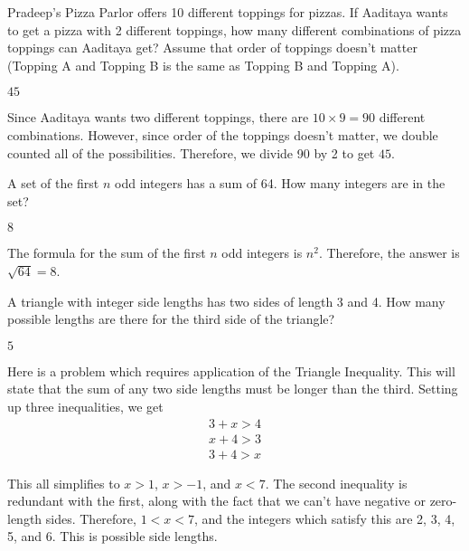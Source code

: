 \documentclass[11pt]{article}
\begin{document}
\begin{problem}
Pradeep's Pizza Parlor offers 10 different toppings for pizzas. If Aaditaya wants to get a pizza with 2 different toppings, how many different combinations of pizza toppings can Aaditaya get? Assume that order of toppings doesn't matter (Topping A and Topping B is the same as Topping B and Topping A).
\end{problem}
\begin{answer}
$\boxed{45}$
\end{answer}
\begin{solution}
Since Aaditaya wants two different toppings, there are $10\times9 = 90$ different combinations. However, since order of the toppings doesn't matter, we double counted all of the possibilities. Therefore, we divide 90 by 2 to get $\boxed{45}$.
\end{solution}

\begin{problem}
A set of the first $n$ odd integers has a sum of 64. How many integers are in the set?
\end{problem}
\begin{answer}
$\boxed{8}$
\end{answer}
\begin{solution}
The formula for the sum of the first $n$ odd integers is $n^2$. Therefore, the answer is $\sqrt{64} = \boxed{8}$.
\end{solution}
\begin{problem}A triangle with integer side lengths has two sides of length 3 and 4. How many possible lengths are there for the third side of the triangle?
\end{problem}
\begin{answer}
$\boxed{5}$
\end{answer}
\begin{solution}Here is a problem which requires application of the Triangle Inequality. This will state that the sum of any two side lengths must be longer than the third. Setting up three inequalities, we get
\begin{align*}
3+x>4\\
x+4>3\\
3+4>x
\end{align*}

This all simplifies to $x>1$, $x>-1$, and $x<7$. The second inequality is redundant with the first, along with the fact that we can't have negative or zero-length sides. Therefore, $1<x<7$, and the integers which satisfy this are 2, 3, 4, 5, and 6. This is  possible side lengths.
\end{solution}
\end{document}
